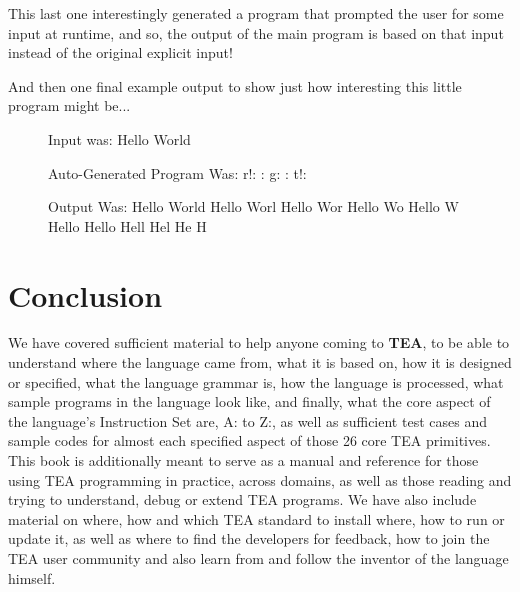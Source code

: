 \documentclass[a4paper, 18pt]{book} %
\begin{document}
This last one interestingly generated a program that prompted the user for some input at runtime, and so, the output of the main program is based on that input instead of the original explicit input!

And then one final example output to show just how interesting this little program might be...

\begin{figure}[H]
  \centering
  \begin{tcbverbatim}[title=Sample Session of Self-Modifying TEA Hello World]
Input was:
Hello World


Auto-Generated Program Was:
r!: :
g: :
t!:


Output Was:
Hello World
Hello Worl
Hello Wor
Hello Wo
Hello W
Hello 
Hello
Hell
Hel
He
H
  \end{tcbverbatim}
\end{figure}



\chapter{Conclusion}
\label{SECCONC}



We have covered sufficient material to help anyone coming to \textbf{TEA}, to be able to understand where the language came from, what it is based on, how it is designed or specified, what the language grammar is, how the language is processed, what sample programs in the language look like, and finally, what the core aspect of the language's Instruction Set are, A: to Z:, as well as sufficient test cases and sample codes for almost each specified aspect of those 26 core TEA primitives. This book is additionally meant to serve as a manual and reference for those using TEA programming in practice, across domains, as well as those reading and trying to understand, debug or extend TEA programs. We have also include material on where, how and which TEA standard to install where, how to run or update it, as well as where to find the developers for feedback, how to join the TEA user community and also learn from and follow the inventor of the language himself.




\begin{appendices}





\end{appendices}
\end{document}
